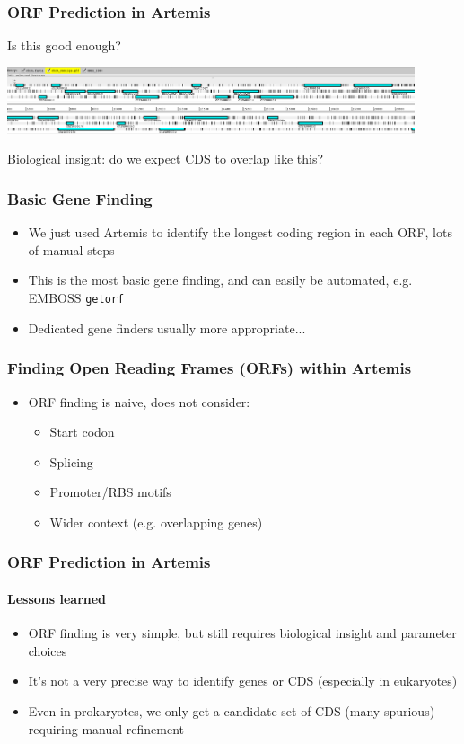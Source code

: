 \documentclass[table]{beamer}
\begin{document}
    \begin{frame}
      \frametitle{ORF Prediction in Artemis}   
      Is this good enough? 
      \begin{center}
        \includegraphics[width=0.9\textwidth]{images/artemis_orf14}     
      \end{center}
      Biological insight: do we expect CDS to overlap like this?
    \end{frame}

\begin{frame}
    \frametitle{Basic Gene Finding}
    \begin{itemize}
      \item We just used Artemis to identify the longest coding region in each ORF, lots of manual steps
      \item This is the most basic gene finding, and can easily be automated, e.g. EMBOSS \texttt{getorf}
      \item Dedicated gene finders usually more appropriate...
    \end{itemize}
\end{frame}

\begin{frame}
    \frametitle{Finding Open Reading Frames (ORFs) within Artemis}
    \begin{itemize}
      \item<1-> ORF finding is naive, does not consider:
      \begin{itemize}
        \item Start codon
        \item Splicing
        \item Promoter/RBS motifs
        \item Wider context (e.g. overlapping genes)
      \end{itemize}
    \end{itemize}
\end{frame}

    \begin{frame}
      \frametitle{ORF Prediction in Artemis}   
      \framesubtitle{Lessons learned}   
      \begin{itemize}
        \item ORF finding is very simple, but still requires biological insight and parameter choices
        \item It's not a very precise way to identify genes or CDS (especially in eukaryotes)
        \item Even in prokaryotes, we only get a candidate set of CDS (many spurious) requiring manual refinement
      \end{itemize}
    \end{frame}
\end{document}
